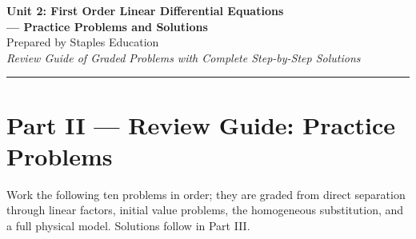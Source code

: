 \documentclass[11pt]{article}
\begin{document}
\begin{center}
    {\LARGE \bfseries Unit 2: First Order Linear Differential Equations \\--- Practice Problems and Solutions}\\[6pt]
    {\large Prepared by Staples Education}\\[4pt]
    {\itshape Review Guide of Graded Problems with Complete Step-by-Step Solutions}
\end{center}

\vspace{0.6em}
\hrule
\vspace{0.6em}

\section*{Part II --- Review Guide: Practice Problems}

Work the following ten problems in order; they are graded from direct
separation through linear factors, initial value problems, the homogeneous
substitution, and a full physical model. Solutions follow in Part III.
\end{document}
